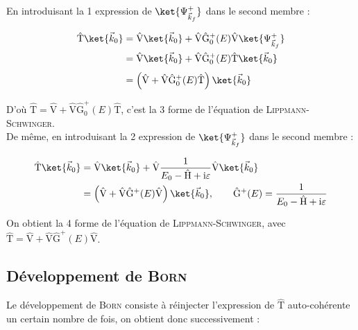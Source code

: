 \documentclass[12pt,a4paper,oneside,french]{book}
\renewcommand{\i}{\mathrm{i}}
\newcommand{\opr}[1]{\mathrm{\hat{#1}}}
\theoremstyle{definition}
\theoremstyle{definition}
\theoremstyle{definition}
\theoremstyle{remark}
\theoremstyle{definition}
\begin{document}
    En introduisant la 1 expression de $\ket{{\Psi}_{{\vec{k}}_{f}}^{+}}$  dans le second membre :
    
    \begin{equation*}
    \begin{split}
        \opr{T} \ket{{\vec{k}}_{0} \vphantom{{\Psi}_{{\vec{k}}_{f}}^{+}}} 
            &= \opr{V} \ket{{\vec{k}}_{0} \vphantom{{\Psi}_{{\vec{k}}_{f}}^{+}}} + \opr{V} {\opr{G}}_{0}^{+}(E) \opr{V} \ket{{\Psi}_{{\vec{k}}_{f}}^{+}} \\
            &= \opr{V} \ket{{\vec{k}}_{0} \vphantom{{\Psi}_{{\vec{k}}_{f}}^{+}}} + \opr{V} {\opr{G}}_{0}^{+}(E) \opr{T} \ket{{\vec{k}}_{0} \vphantom{{\Psi}_{{\vec{k}}_{f}}^{+}}} \\
            &= \left(\opr{V} + \opr{V} {\opr{G}}_{0}^{+}(E) \opr{T}\right) \ket{{\vec{k}}_{0} \vphantom{{\Psi}_{{\vec{k}}_{f}}^{+}}}
    \end{split}
    \end{equation*}
    
    D'où $\opr{T} = \opr{V} + \opr{V} {\opr{G}}_{0}^{+}(E) \opr{T}$, c'est la 3 forme de l'équation de \textsc{Lippmann-Schwinger}. \\
    
    De même, en introduisant la 2 expression de $\ket{{\Psi}_{{\vec{k}}_{f}}^{+}}$  dans le second membre :
    
    \begin{equation*}
    \begin{split}
        \opr{T} \ket{{\vec{k}}_{0} \vphantom{{\Psi}_{{\vec{k}}_{f}}^{+}}}
            &= \opr{V} \ket{{\vec{k}}_{0} \vphantom{{\Psi}_{{\vec{k}}_{f}}^{+}}} + \opr{V} \frac{1}{{E}_{0} - \opr{H} + \i \varepsilon} \opr{V} \ket{{\vec{k}}_{0} \vphantom{{\Psi}_{{\vec{k}}_{f}}^{+}}} \\
            &= \left(\opr{V} + \opr{V} {\opr{G}}^{+}(E) \opr{V}\right) \ket{{\vec{k}}_{0} \vphantom{{\Psi}_{{\vec{k}}_{f}}^{+}}}, \qquad {\opr{G}}^{+}(E) = \frac{1}{{E}_{0} - \opr{H} + \i \varepsilon}
    \end{split}
    \end{equation*}
    
    On obtient la 4 forme de l'équation de \textsc{Lippmann-Schwinger}, avec $\opr{T} = \opr{V} + \opr{V} {\opr{G}}^{+}(E) \opr{V}$.
    
    \subsection{Développement de \textsc{Born}}
    Le développement de \textsc{Born} consiste à réinjecter l'expression de $\opr{T}$ auto-cohérente un certain nombre de fois, on obtient donc successivement :
    
\end{document}
